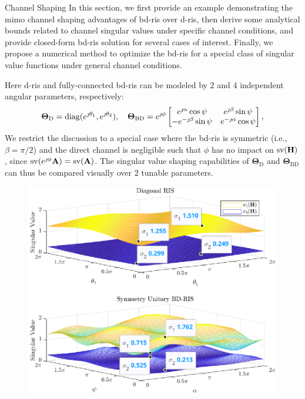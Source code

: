 \documentclass[journal]{IEEEtran}
\begin{document}
\begin{section}{Channel Shaping}
	In this section, we first provide an example demonstrating the \gls{mimo} channel shaping advantages of \gls{bd}-\gls{ris} over \gls{d}-\gls{ris}, then derive some analytical bounds related to channel singular values under specific channel conditions, and provide closed-form \gls{bd}-\gls{ris} solution for several cases of interest.
	Finally, we propose a numerical method to optimize the \gls{bd}-\gls{ris} for a special class of singular value functions under general channel conditions.

	\begin{example}
		\label{eg:shaping_potential}
		Here \gls{d}-\gls{ris} and fully-connected \gls{bd}-\gls{ris} can be modeled by 2 and 4 independent angular parameters, respectively:
		\begin{equation*}
			\mathbf{\Theta}_\mathrm{D} = \operatorname{diag}(e^{\jmath \theta_1}, e^{\jmath \theta_2}), \quad
			\mathbf{\Theta}_\mathrm{BD} = e^{\jmath \phi} \begin{bmatrix}
				e^{\jmath \alpha} \cos \psi  & e^{\jmath \beta} \sin \psi   \\
				-e^{-\jmath \beta} \sin \psi & e^{-\jmath \alpha} \cos \psi
			\end{bmatrix},
		\end{equation*}
		We restrict the discussion to a special case where the \gls{bd}-\gls{ris} is symmetric (i.e., $\beta = \pi / 2$) and the direct channel is negligible such that $\phi$ has no impact on $\operatorname{sv}(\mathbf{H})$, since $\operatorname{sv}(e^{\jmath \phi} \mathbf{A}) = \operatorname{sv}(\mathbf{A})$.
		The singular value shaping capabilities of $\mathbf{\Theta}_\mathrm{D}$ and $\mathbf{\Theta}_\mathrm{BD}$ can thus be compared visually over 2 tunable parameters.
		\begin{figure}
			\centering
			\includegraphics[width=0.7\columnwidth]{../assets/simulation/pc_singular_trend.eps}

\end{figure}
\end{example}
\end{section}
\end{document}
